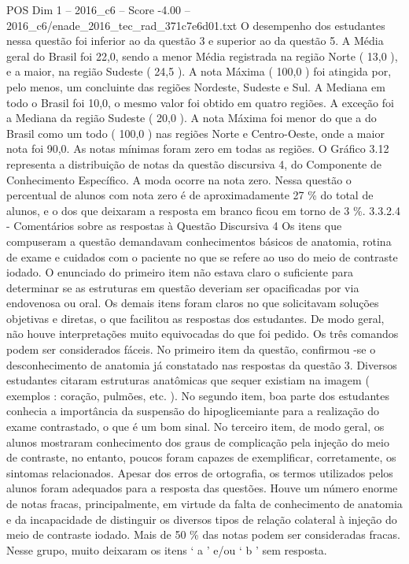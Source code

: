 \begin{textsample}{POS Dim 1 – 2016\_c6 – Score -4.00 – 2016\_c6/enade\_2016\_tec\_rad\_371c7e6d01.txt}
O desempenho dos estudantes nessa questão foi inferior ao da questão 3 e superior ao da questão 5.
A Média geral do Brasil foi 22,0, sendo a menor Média registrada na região Norte ( 13,0 ), e a maior, na região Sudeste ( 24,5 ).
A nota Máxima ( 100,0 ) foi atingida por, pelo menos, um concluinte das regiões Nordeste, Sudeste e Sul.
A Mediana em todo o Brasil foi 10,0, o mesmo valor foi obtido em quatro regiões.
A exceção foi a Mediana da região Sudeste ( 20,0 ).
A nota Máxima foi menor do que a do Brasil como um todo ( 100,0 ) nas regiões Norte e Centro-Oeste, onde a maior nota foi 90,0.
As notas mínimas foram zero em todas as regiões.
O Gráfico 3.12 representa a distribuição de notas da questão discursiva 4, do Componente de Conhecimento Específico.
A moda ocorre na nota zero.
Nessa questão o percentual de alunos com nota zero é de aproximadamente 27 \% do total de alunos, e o dos que deixaram a resposta em branco ficou em torno de 3 \%. 3.3.2.4 - Comentários sobre as respostas à Questão Discursiva 4 Os itens que compuseram a questão demandavam conhecimentos básicos de anatomia, rotina de exame e cuidados com o paciente no que se refere ao uso do meio de contraste iodado.
O enunciado do primeiro item não estava claro o suficiente para determinar se as estruturas em questão deveriam ser opacificadas por via endovenosa ou oral.
Os demais itens foram claros no que solicitavam soluções objetivas e diretas, o que facilitou as respostas dos estudantes.
De modo geral, não houve interpretações muito equivocadas do que foi pedido.
Os três comandos podem ser considerados fáceis.
No primeiro item da questão, confirmou -se o desconhecimento de anatomia já constatado nas respostas da questão 3.
Diversos estudantes citaram estruturas anatômicas que sequer existiam na imagem ( exemplos : coração, pulmões, etc. ).
No segundo item, boa parte dos estudantes conhecia a importância da suspensão do hipoglicemiante para a realização do exame contrastado, o que é um bom sinal.
No terceiro item, de modo geral, os alunos mostraram conhecimento dos graus de complicação pela injeção do meio de contraste, no entanto, poucos foram capazes de exemplificar, corretamente, os sintomas relacionados.
Apesar dos erros de ortografia, os termos utilizados pelos alunos foram adequados para a resposta das questões.
Houve um número enorme de notas fracas, principalmente, em virtude da falta de conhecimento de anatomia e da incapacidade de distinguir os diversos tipos de relação colateral à injeção do meio de contraste iodado.
Mais de 50 \% das notas podem ser consideradas fracas.
Nesse grupo, muito deixaram os itens ‘ a ’ e/ou ‘ b ’ sem resposta.

\end{textsample}
